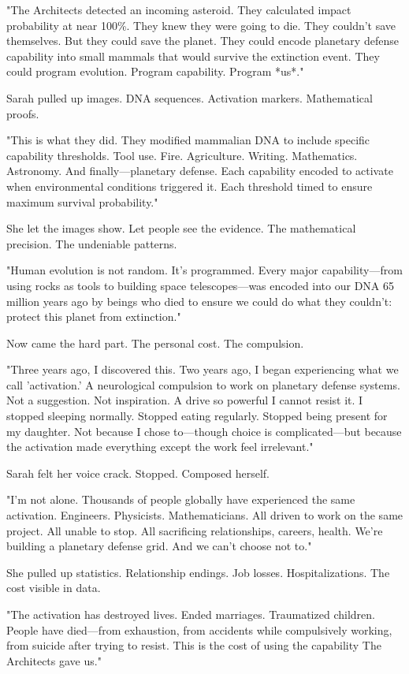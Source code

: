 "The Architects detected an incoming asteroid. They calculated impact probability at near 100\%. They knew they were going to die. They couldn't save themselves. But they could save the planet. They could encode planetary defense capability into small mammals that would survive the extinction event. They could program evolution. Program capability. Program *us*."

Sarah pulled up images. DNA sequences. Activation markers. Mathematical proofs.

"This is what they did. They modified mammalian DNA to include specific capability thresholds. Tool use. Fire. Agriculture. Writing. Mathematics. Astronomy. And finally—planetary defense. Each capability encoded to activate when environmental conditions triggered it. Each threshold timed to ensure maximum survival probability."

She let the images show. Let people see the evidence. The mathematical precision. The undeniable patterns.

"Human evolution is not random. It's programmed. Every major capability—from using rocks as tools to building space telescopes—was encoded into our DNA 65 million years ago by beings who died to ensure we could do what they couldn't: protect this planet from extinction."

Now came the hard part. The personal cost. The compulsion.

"Three years ago, I discovered this. Two years ago, I began experiencing what we call 'activation.' A neurological compulsion to work on planetary defense systems. Not a suggestion. Not inspiration. A drive so powerful I cannot resist it. I stopped sleeping normally. Stopped eating regularly. Stopped being present for my daughter. Not because I chose to—though choice is complicated—but because the activation made everything except the work feel irrelevant."

Sarah felt her voice crack. Stopped. Composed herself.

"I'm not alone. Thousands of people globally have experienced the same activation. Engineers. Physicists. Mathematicians. All driven to work on the same project. All unable to stop. All sacrificing relationships, careers, health. We're building a planetary defense grid. And we can't choose not to."

She pulled up statistics. Relationship endings. Job losses. Hospitalizations. The cost visible in data.

"The activation has destroyed lives. Ended marriages. Traumatized children. People have died—from exhaustion, from accidents while compulsively working, from suicide after trying to resist. This is the cost of using the capability The Architects gave us."

